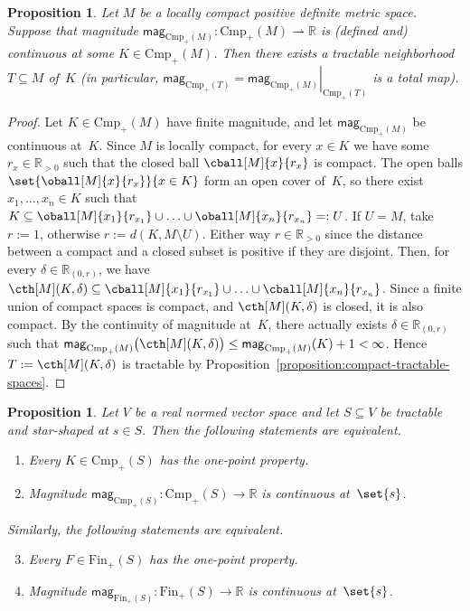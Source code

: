 \documentclass[11pt]{article}
\theoremstyle{plain}
\newtheorem{proposition}[theorem]{Proposition}
\theoremstyle{definition}
\newcommand{\RR}{\mathbb{R}}
\newcommand{\intoo}[3][\RR]{{#1}_{(#2, #3)}}
\newcommand{\rstr}[1]{\left.{#1}\right|}  %
\newcommand{\parto}{\mathrel{\rightharpoonup}}  %
\newcommand{\mg}[1][]{\mathsf{mag}_{#1}}
\newcommand{\fsub}{\mathrm{Fin}}
\newcommand{\ifsub}{\fsub_{+}}
\newcommand{\csub}{\mathrm{Cmp}}
\newcommand{\icsub}{\csub_{+}}
\begin{document}
\begin{proposition}
Let $M$ be a locally compact positive definite metric space. Suppose that magnitude $\mg[\icsub(M)]\colon \icsub(M) \parto \RR$ is (defined and) continuous at some $K \in \icsub(M)$. Then there exists a tractable neighborhood $T \subseteq M$ of~$K$ (in particular, $\mg[\icsub(T)] = \rstr{\mg[\icsub(M)]}_{\icsub(T)}$ is a total map).
\end{proposition}

\begin{proof}
Let $K \in \icsub(M)$ have finite magnitude, and let $\mg[\icsub(M)]$ be continuous at~$K$. Since $M$ is locally compact, for every $x \in K$ we have some $r_x \in \RR_{> 0}$ such that the closed ball $\cball[M]{x}{r_x}$ is compact. The open balls $\set{\oball[M]{x}{r_x}}{x \in K}$ form an open cover of~$K$, so there exist $x_1, \ldots, x_n \in K$ such that $K \subseteq \oball[M]{x_1}{r_{x_1}} \cup \ldots \cup \oball[M]{x_n}{r_{x_n}} =: U$. If $U = M$, take $r := 1$, otherwise $r := d(K, M \setminus U)$. Either way $r \in \RR_{> 0}$ since the distance between a compact and a closed subset is positive if they are disjoint. Then, for every $\delta \in \intoo{0}{r}$, we have $\cth[M](K, \delta) \subseteq \cball[M]{x_1}{r_{x_1}} \cup \ldots \cup \cball[M]{x_n}{r_{x_n}}$. Since a finite union of compact spaces is compact, and $\cth[M](K, \delta)$ is closed, it is also compact. By the continuity of magnitude at~$K$, there actually exists $\delta \in \intoo{0}{r}$ such that $\mg[\icsub(M)]\big(\cth[M](K, \delta)\big) \leq \mg[\icsub(M)](K) + 1 < \infty$. Hence $T := \cth[M](K, \delta)$ is tractable by Proposition~\ref{proposition:compact-tractable-spaces}.
\end{proof}

\begin{proposition}\label{proposition:one-point-property-is-singleton-magnitude-continuity}
Let $V$ be a real normed vector space and let $S \subseteq V$ be tractable and star-shaped at $s \in S$. Then the following statements are equivalent.
\begin{enumerate}[label=(\roman*)]
\item
Every $K \in \icsub(S)$ has the one-point property.
\item
Magnitude $\mg[\icsub(S)]\colon \icsub(S) \to \RR$ is continuous at~$\set{s}$.
\end{enumerate}
Similarly, the following statements are equivalent.
\begin{enumerate}[label=(\roman*)]
\setcounter{enumi}{2}
\item
Every $F \in \ifsub(S)$ has the one-point property.
\item
Magnitude $\mg[\ifsub(S)]\colon \ifsub(S) \to \RR$ is continuous at~$\set{s}$.
\end{enumerate}
\end{proposition}
\end{document}
